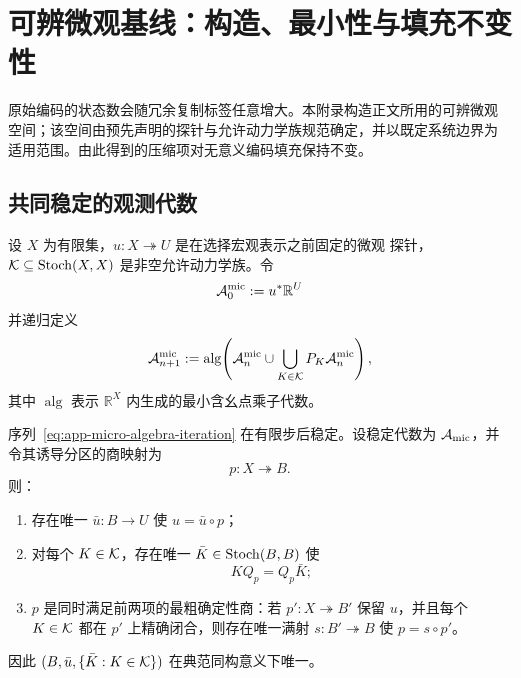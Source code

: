 \section{可辨微观基线：构造、最小性与填充不变性}
\label{app:operational-baseline}

原始编码的状态数会随冗余复制标签任意增大。本附录构造正文所用的可辨微观
空间；该空间由预先声明的探针与允许动力学族规范确定，并以既定系统边界为
适用范围。由此得到的压缩项对无意义编码填充保持不变。

\subsection{共同稳定的观测代数}

设 $X$ 为有限集，$u:X\twoheadrightarrow U$ 是在选择宏观表示之前固定的微观
探针，$\mathcal K\subseteq\operatorname{Stoch}(X,X)$ 是非空允许动力学族。令
\[
  \mathcal A^{\mathrm{mic}}_0:=u^*\mathbb R^U
\]
并递归定义
\begin{equation}
  \mathcal A^{\mathrm{mic}}_{n+1}
  :=\operatorname{alg}\!\left(
      \mathcal A^{\mathrm{mic}}_n
      \cup\bigcup_{K\in\mathcal K}P_K\mathcal A^{\mathrm{mic}}_n
    \right),
  \label{eq:app-micro-algebra-iteration}
\end{equation}
其中 $\operatorname{alg}$ 表示 $\mathbb R^X$ 内生成的最小含幺点乘子代数。

\begin{theorem}[可辨微观商]
\label{thm:app-operational-core}
序列~\eqref{eq:app-micro-algebra-iteration} 在有限步后稳定。设稳定代数为
$\mathcal A_{\mathrm{mic}}$，并令其诱导分区的商映射为
\[
  p:X\twoheadrightarrow B.
\]
则：
\begin{enumerate}
  \item 存在唯一 $\bar u:B\to U$ 使 $u=\bar u\circ p$；
  \item 对每个 $K\in\mathcal K$，存在唯一 $\bar K\in\operatorname{Stoch}(B,B)$ 使
  \begin{equation}
    KQ_p=Q_p\bar K;
    \label{eq:app-operational-intertwining}
  \end{equation}
  \item $p$ 是同时满足前两项的最粗确定性商：若
  $p':X\twoheadrightarrow B'$ 保留 $u$，并且每个 $K\in\mathcal K$ 都在 $p'$
  上精确闭合，则存在唯一满射 $s:B'\twoheadrightarrow B$ 使
  $p=s\circ p'$。
\end{enumerate}
因此 $(B,\bar u,\{\bar K:K\in\mathcal K\})$ 在典范同构意义下唯一。
\end{theorem}

